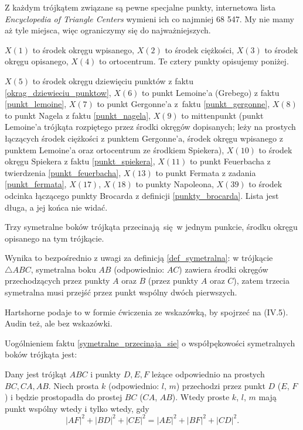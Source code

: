 Z każdym trójkątem związane są pewne specjalne punkty, internetowa lista \emph{Encyclopedia of Triangle Centers} wymieni ich co najmniej 68 547.
My nie mamy aż tyle miejsca, więc ograniczymy się do najważniejszych.

$X(1)$ to środek okręgu wpisanego, 
$X(2)$ to środek ciężkości,
$X(3)$ to środek okręgu opisanego,
$X(4)$ to ortocentrum.
Te cztery punkty opisujemy poniżej.

$X(5)$ to środek okręgu dziewięciu punktów z faktu \ref{okrag_dziewieciu_punktow},
$X(6)$ to punkt Lemoine'a (Grebego) z faktu \ref{punkt_lemoine},
$X(7)$ to punkt Gergonne'a z~faktu \ref{punkt_gergonne},
$X(8)$ to punkt Nagela z faktu \ref{punkt_nagela}, 
$X(9)$ to mittenpunkt (punkt Lemoine'a trójkąta rozpiętego przez środki okręgów dopisanych; leży na prostych łączących środek ciężkości z punktem Gergonne'a, środek okręgu wpisanego z punktem Lemoine'a oraz ortocentrum ze środkiem Spiekera), %
$X(10)$ to środek okręgu Spiekera z faktu \ref{punkt_spiekera},
$X(11)$ to punkt Feuerbacha z twierdzenia \ref{punkt_feuerbacha},
$X(13)$ to punkt Fermata z zadania \ref{punkt_fermata},
$X(17)$, $X(18)$ to punkty Napoleona,
$X(39)$ to środek odcinka łączącego punkty Brocarda z definicji \ref{punkty_brocarda}.
Lista jest długa, a jej końca nie widać.

\begin{proposition}
    \label{symetralne_przecinaja_sie}
    Trzy symetralne boków trójkąta przecinają się w jednym punkcie, środku okręgu opisanego na tym trójkącie.
\end{proposition}

Wynika to bezpośrednio z uwagi za definicją \ref{def_symetralna}: w trójkącie $\triangle ABC$, symetralna boku $AB$ (odpowiednio: $AC$) zawiera środki okręgów przechodzących przez punkty $A$ oraz $B$ (przez punkty $A$ oraz $C$), zatem trzecia symetralna musi przejść przez punkt wspólny dwóch pierwszych.

Hartshorne \cite[s. 16]{hartshorne2000} podaje to w formie ćwiczenia ze wskazówką, by spojrzeć na (IV.5).
Audin \cite[s. 61]{audin_2003} też, ale bez wskazówki.

Uogólnieniem faktu \ref{symetralne_przecinaja_sie} o współpękowości symetralnych boków trójkąta jest:

\begin{theorem}[Carnota]
%
\label{guzicki_6_13}%
	Dany jest trójkąt $ABC$ i punkty $D, E, F$ leżące odpowiednio na prostych $BC, CA, AB$.
	Niech prosta $k$ (odpowiednio: $l$, $m$) przechodzi przez punkt $D$ ($E$, $F$) i będzie prostopadła do prostej $BC$ ($CA$, $AB$).
	Wtedy proste $k$, $l$, $m$ mają punkt wspólny wtedy i tylko wtedy, gdy
	\begin{equation}
		|AF|^2 + |BD|^2 + |CE|^2 = |AE|^2 + |BF|^2 + |CD|^2.
	\end{equation}
\end{theorem}

